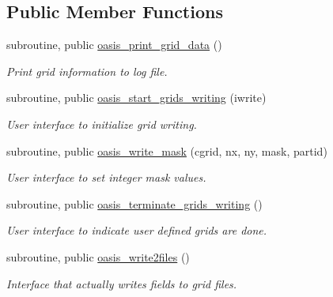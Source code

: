 \subsection*{Public Member Functions}
\begin{DoxyCompactItemize}
\item 
subroutine, public \hyperlink{classmod__oasis__grid_a4bc230ba4aa317f666bdab2416b4f6da}{oasis\+\_\+print\+\_\+grid\+\_\+data} ()
\begin{DoxyCompactList}\small\item\em Print grid information to log file. \end{DoxyCompactList}\item 
subroutine, public \hyperlink{classmod__oasis__grid_acb0569d8677f0762559ed6b211945d9b}{oasis\+\_\+start\+\_\+grids\+\_\+writing} (iwrite)
\begin{DoxyCompactList}\small\item\em User interface to initialize grid writing. \end{DoxyCompactList}\item 
subroutine, public \hyperlink{classmod__oasis__grid_a16906db2b252a3a5ce85e21aa1336e3b}{oasis\+\_\+write\+\_\+mask} (cgrid, nx, ny, mask, partid)
\begin{DoxyCompactList}\small\item\em User interface to set integer mask values. \end{DoxyCompactList}\item 
subroutine, public \hyperlink{classmod__oasis__grid_a59755e271ccdd0c98807b5938ef33e78}{oasis\+\_\+terminate\+\_\+grids\+\_\+writing} ()
\begin{DoxyCompactList}\small\item\em User interface to indicate user defined grids are done. \end{DoxyCompactList}\item 
subroutine, public \hyperlink{classmod__oasis__grid_a275791c512cefae9799e188d92b6f9d4}{oasis\+\_\+write2files} ()
\begin{DoxyCompactList}\small\item\em Interface that actually writes fields to grid files. \end{DoxyCompactList}\end{DoxyCompactItemize}
